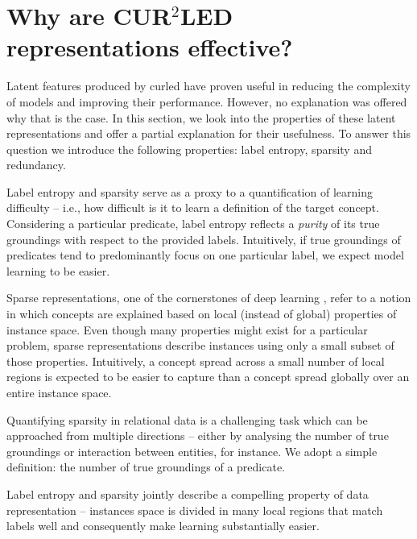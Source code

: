 



\section{Why are CUR$^2$LED representations effective?}


Latent features produced by \gls{curled} have proven useful in reducing the complexity of models and improving their performance.
However, no explanation was offered why that is the case.
In this section, we look into the properties of these latent representations and offer a partial explanation for their usefulness.
To answer this question we introduce the following properties: label entropy, sparsity and redundancy.



Label entropy and sparsity serve as a proxy to a quantification of learning difficulty -- i.e., how difficult is it to learn a definition of the target concept.
Considering a particular predicate, label entropy reflects a \textit{purity} of its true groundings with respect to the provided labels.
Intuitively, if true groundings of predicates tend to predominantly focus on one particular label, we expect model learning to be easier.


Sparse representations, one of the cornerstones of deep learning \cite{Bengio2013RLR}, refer to a notion in which concepts are explained based on local (instead of global) properties of instance space.
Even though many properties might exist for a particular problem, sparse representations describe instances using only a small subset of those properties.
Intuitively, a concept spread across a small number of local regions is expected to be easier to capture than a concept spread globally over an entire instance space.



Quantifying sparsity in relational data is a challenging task which can be approached from multiple directions -- either by analysing the number of true groundings or interaction between entities, for instance.
We adopt a simple definition: the number of true groundings of a predicate.


Label entropy and sparsity jointly describe a compelling property of data representation --  instances space is divided in many local regions that match labels well  and consequently make learning substantially easier.




